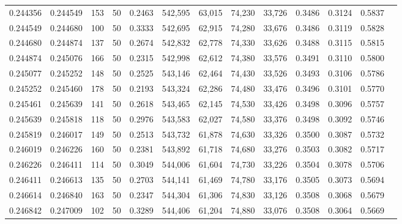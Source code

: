 \begin{tabular}{rrrrrrrrrrrrr}
0.244356 & 0.244549 &   153 &  50 &                                     0.2463 & 542,595 &  63,015 &  74,230 &  33,726 & 0.3486 & 0.3124 & 0.5837 \\
0.244549 & 0.244680 &   100 &  50 &                                     0.3333 & 542,695 &  62,915 &  74,280 &  33,676 & 0.3486 & 0.3119 & 0.5828 \\
0.244680 & 0.244874 &   137 &  50 &                                     0.2674 & 542,832 &  62,778 &  74,330 &  33,626 & 0.3488 & 0.3115 & 0.5815 \\
0.244874 & 0.245076 &   166 &  50 &                                     0.2315 & 542,998 &  62,612 &  74,380 &  33,576 & 0.3491 & 0.3110 & 0.5800 \\
0.245077 & 0.245252 &   148 &  50 &                                     0.2525 & 543,146 &  62,464 &  74,430 &  33,526 & 0.3493 & 0.3106 & 0.5786 \\
0.245252 & 0.245460 &   178 &  50 &                                     0.2193 & 543,324 &  62,286 &  74,480 &  33,476 & 0.3496 & 0.3101 & 0.5770 \\
0.245461 & 0.245639 &   141 &  50 &                                     0.2618 & 543,465 &  62,145 &  74,530 &  33,426 & 0.3498 & 0.3096 & 0.5757 \\
0.245639 & 0.245818 &   118 &  50 &                                     0.2976 & 543,583 &  62,027 &  74,580 &  33,376 & 0.3498 & 0.3092 & 0.5746 \\
0.245819 & 0.246017 &   149 &  50 &                                     0.2513 & 543,732 &  61,878 &  74,630 &  33,326 & 0.3500 & 0.3087 & 0.5732 \\
0.246019 & 0.246226 &   160 &  50 &                                     0.2381 & 543,892 &  61,718 &  74,680 &  33,276 & 0.3503 & 0.3082 & 0.5717 \\
0.246226 & 0.246411 &   114 &  50 &                                     0.3049 & 544,006 &  61,604 &  74,730 &  33,226 & 0.3504 & 0.3078 & 0.5706 \\
0.246411 & 0.246613 &   135 &  50 &                                     0.2703 & 544,141 &  61,469 &  74,780 &  33,176 & 0.3505 & 0.3073 & 0.5694 \\
0.246614 & 0.246840 &   163 &  50 &                                     0.2347 & 544,304 &  61,306 &  74,830 &  33,126 & 0.3508 & 0.3068 & 0.5679 \\
0.246842 & 0.247009 &   102 &  50 &                                     0.3289 & 544,406 &  61,204 &  74,880 &  33,076 & 0.3508 & 0.3064 & 0.5669 \\

\end{tabular}
